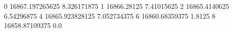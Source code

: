 0 16867.197265625 8.326171875
1 16866.28125 7.41015625
2 16865.4140625 6.54296875
4 16865.923828125 7.052734375
6 16860.68359375 1.8125
8 16858.87109375 0.0
